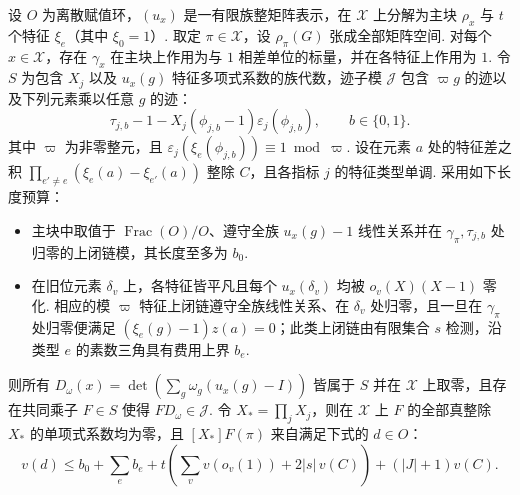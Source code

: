 \begin{lemma}
\label{lem:c-abstract-ribet-element}
\emitthmsource
设 $O$ 为离散赋值环，$(u_x)$ 是一有限族整矩阵表示，在 $\mathcal X$ 上分解为主块 $\rho_x$ 与 $t$ 个特征 $\xi_e$（其中 $\xi_0=1$）. 取定 $\pi\in\mathcal X$，设 $\rho_\pi(G)$ 张成全部矩阵空间. 对每个 $x\in\mathcal X$，存在 $\gamma_x$ 在主块上作用为与 $1$ 相差单位的标量，并在各特征上作用为 $1$. 令 $S$ 为包含 $X_j$ 以及 $u_x(g)$ 特征多项式系数的族代数，迹子模 $\mathcal J$ 包含 $\varpi g$ 的迹以及下列元素乘以任意 $g$ 的迹：
\[
  \tau_{j,b}-1-X_j(\phi_{j,b}-1)\varepsilon_j(\phi_{j,b}),
  \qquad b\in\{0,1\}.
\]
其中 $\varpi$ 为非零整元，且 $\varepsilon_j(\xi_e(\phi_{j,b}))\equiv1\bmod\varpi$. 设在元素 $a$ 处的特征差之积 $\prod_{e'\ne e}(\xi_e(a)-\xi_{e'}(a))$ 整除 $C$，且各指标 $j$ 的特征类型单调. 采用如下长度预算：
\begin{itemize}
\item 主块中取值于 $\operatorname{Frac}(O)/O$、遵守全族 $u_x(g)-1$ 线性关系并在 $\gamma_\pi,\tau_{j,b}$ 处归零的上闭链模，其长度至多为 $b_0$.
\item 在旧位元素 $\delta_v$ 上，各特征皆平凡且每个 $u_x(\delta_v)$ 均被 $o_v(X)(X-1)$ 零化. 相应的模 $\varpi$ 特征上闭链遵守全族线性关系、在 $\delta_v$ 处归零，且一旦在 $\gamma_\pi$ 处归零便满足 $(\xi_e(g)-1)z(a)=0$；此类上闭链由有限集合 $s$ 检测，沿类型 $e$ 的素数三角具有费用上界 $b_e$.
\end{itemize}
则所有 $D_\omega(x)=\det(\sum_g\omega_g(u_x(g)-I))$ 皆属于 $S$ 并在 $\mathcal X$ 上取零，且存在共同乘子 $F\in S$ 使得 $F D_\omega\in\mathcal J$. 令 $X_\ast=\prod_j X_j$，则在 $\mathcal X$ 上 $F$ 的全部真整除 $X_\ast$ 的单项式系数均为零，且 $[X_\ast]F(\pi)$ 来自满足下式的 $d\in O$：
\[
 v(d)\le b_0+\sum_e b_e+
 t\left(\sum_v v(o_v(1))+2|s|\,v(C)\right)+(|J|+1)v(C).
\]
\end{lemma}

